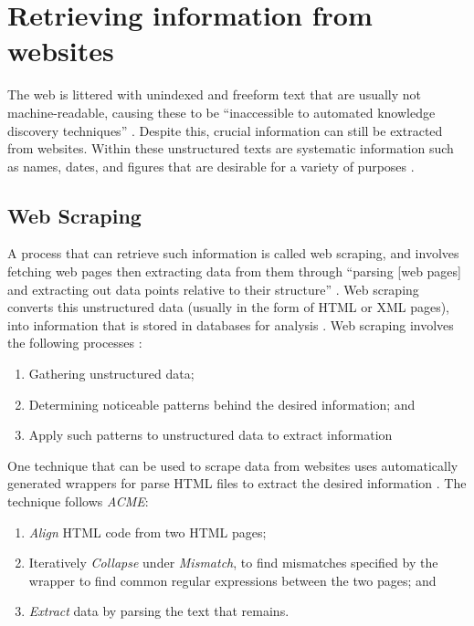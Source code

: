 \section{Retrieving information from websites}

The web is littered with unindexed and freeform text that are usually not machine-readable, causing these to be ``inaccessible to automated knowledge discovery techniques'' \cite{soderland1997learning}. Despite this, crucial information can still be extracted from websites. Within these unstructured texts are systematic information such as names, dates, and figures that are desirable for a variety of purposes \cite{munzert2014automated}.

\subsection{Web Scraping}
A process that can retrieve such information is called web scraping, and involves fetching web pages then extracting data from them through ``parsing [web pages] and extracting out data points relative to their structure'' \cite{penman2009web}. Web scraping converts this unstructured data (usually in the form of HTML or XML pages), into information that is stored in databases for analysis \cite{vargiu2012exploiting}. Web scraping involves the following processes \cite{munzert2014automated}:

\begin{enumerate}
\item Gathering unstructured data; 
\item Determining noticeable patterns behind the desired information;  and
\item Apply such patterns to unstructured data to extract information
\end{enumerate}

One technique that can be used to scrape data from websites uses automatically generated wrappers for parse HTML files to extract the desired information \cite{crescenzi2001roadrunner}. The technique follows \textit{ACME}:
\begin{enumerate}
\item \textit{Align} HTML code from two HTML pages;
\item Iteratively \textit{Collapse} under \textit{Mismatch}, to find mismatches specified by the wrapper to find common regular expressions between the two pages; and
\item \textit{Extract} data by parsing the text that remains.
\end{enumerate}

